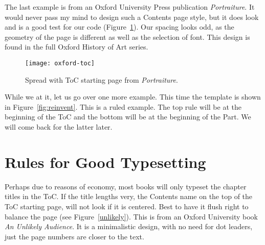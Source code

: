 %

The last example is from an Oxford University Press publication \textit{Portraiture}. It would never pass my mind to design such a Contents page style, but it does look and is a good test for our code  (Figure~\ref{tocsample}). Our spacing looks odd, as the geometry of the page is different as well as the selection of font. This design is found in the full Oxford History of Art series.

\begin{figure}[htbp]
\centering
\texttt{[image: oxford-toc]}
\caption{Spread with ToC starting page from \textit{Portraiture}.}
\label{tocsample}
\end{figure}

While we at it, let us go over one more example. This time the template is shown in Figure~\ref{fig:reinvent}. This is a ruled example. The top rule will be at the beginning of the ToC and the bottom will be at the beginning of the Part. We will come back for the latter later.

\section{Rules for Good Typesetting}

Perhaps due to reasons of economy, most books will only typeset the chapter titles in the ToC. If the title lengths very, the Contents name on the top of the ToC starting page, will not look if it is centered. Best to have it flush right to balance the page (see Figure~\ref{unlikely}). This is from an Oxford University book \textit{An Unlikely Audience}. It is a minimalistic design, with no need for dot leaders, just the page numbers are closer to the text. 

